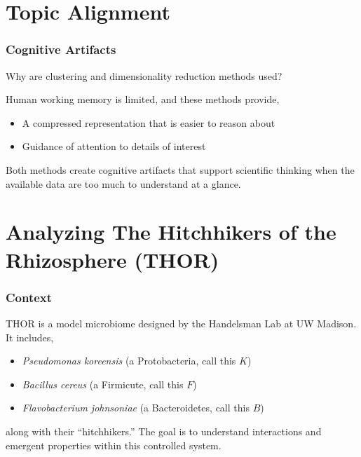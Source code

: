 \documentclass[hyperref={colorlinks=true, linkcolor=violet, citecolor=SeaGreen}]{beamer}
\begin{document}
\section{Topic Alignment}

\begin{frame}
\frametitle{Cognitive Artifacts}
  Why are clustering and dimensionality reduction methods used?

 Human working memory is limited, and these methods provide,
  \begin{itemize}
    \item A compressed representation that is easier to reason about
    \item Guidance of attention to details of interest
\end{itemize}

Both methods create cognitive artifacts that support scientific thinking when
the available data are too much to understand at a glance.
\end{frame}



\section{Analyzing The Hitchhikers of the Rhizosphere (THOR)}

\begin{frame}
  \frametitle{Context}
  THOR is a model microbiome designed by the Handelsman Lab at UW Madison. It
  includes,
  \begin{itemize}
  \item \textit{Pseudomonas koreensis} (a Protobacteria, call this $K$)
  \item \textit{Bacillus cereus} (a Firmicute, call this $F$)
  \item \textit{Flavobacterium johnsoniae} (a Bacteroidetes, call this $B$)
  \end{itemize}
  along with their ``hitchhikers.'' The goal is to understand interactions and
  emergent properties within this controlled system.
\end{frame}
\end{document}
